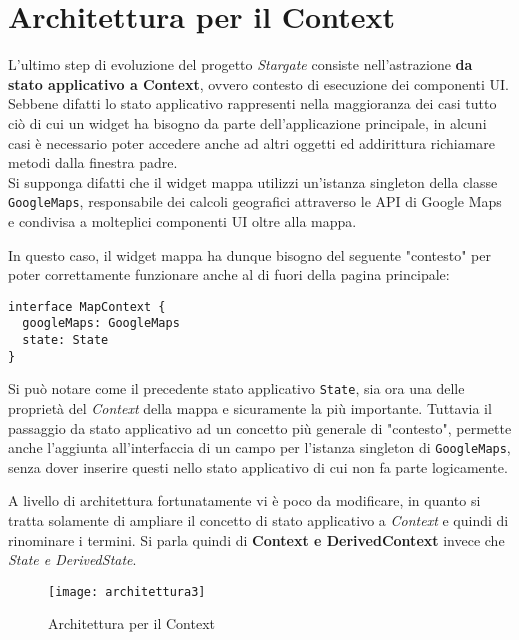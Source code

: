 
\chapter{Architettura per il Context}
\label{cap:architettura-context}

L'ultimo step di evoluzione del progetto \textit{Stargate} consiste nell'astrazione \textbf{da stato applicativo a Context}, ovvero contesto di esecuzione dei componenti UI. Sebbene difatti lo stato applicativo rappresenti nella maggioranza dei casi tutto ciò di cui un widget ha bisogno da parte dell'applicazione principale, in alcuni casi è necessario poter accedere anche ad altri oggetti ed addirittura richiamare metodi dalla finestra padre. \\

Si supponga difatti che il widget mappa utilizzi un'istanza \gls{singleton} della classe \texttt{GoogleMaps}, responsabile dei calcoli geografici attraverso le API di Google Maps e condivisa a molteplici componenti UI oltre alla mappa.

In questo caso, il widget mappa ha dunque bisogno del seguente "contesto" per poter correttamente funzionare anche al di fuori della pagina principale: \\

\begin{lstlisting}
interface MapContext {
  googleMaps: GoogleMaps
  state: State
}
\end{lstlisting}

Si può notare come il precedente stato applicativo \texttt{State}, sia ora una delle proprietà del \textit{Context} della mappa e sicuramente la più importante. Tuttavia il passaggio da stato applicativo ad un concetto più generale di "contesto", permette anche l'aggiunta all'interfaccia di un campo per l'istanza singleton di \texttt{GoogleMaps}, senza dover inserire questi nello stato applicativo di cui non fa parte logicamente. 

A livello di architettura fortunatamente vi è poco da modificare, in quanto si tratta solamente di ampliare il concetto di stato applicativo a \textit{Context} e quindi di rinominare i termini. Si parla quindi di \textbf{Context e DerivedContext} invece che \textit{State e DerivedState}.

\begin{figure}[H] 
  \centering 
  \texttt{[image: architettura3]} 
  \caption{Architettura per il Context}
\end{figure}

